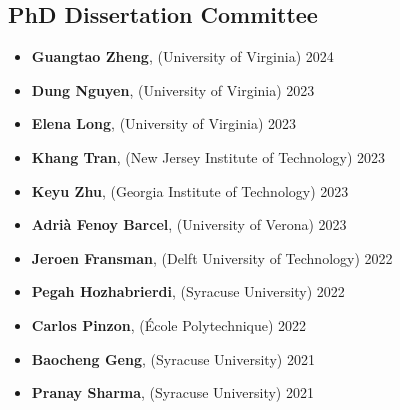 \subsection*{PhD Dissertation Committee}
\begin{itemize}
  \item \textbf{Guangtao Zheng}, ({\sc University of Virginia}) \hfill 2024
  \item \textbf{Dung Nguyen}, ({\sc University of Virginia}) \hfill 2023
  \item \textbf{Elena Long}, ({\sc University of Virginia}) \hfill 2023
  \item \textbf{Khang Tran}, ({\sc New Jersey Institute of Technology}) \hfill 2023
  \item \textbf{Keyu Zhu}, ({\sc Georgia Institute of Technology}) \hfill 2023
  \item \textbf{Adrià Fenoy Barcel}, ({\sc University of Verona}) \hfill 2023
  \item \textbf{Jeroen Fransman}, ({\sc Delft University of Technology}) \hfill 2022
  \item \textbf{Pegah Hozhabrierdi}, ({\sc Syracuse University}) \hfill 2022
  \item \textbf{Carlos Pinzon}, ({\sc École Polytechnique}) \hfill 2022
  \item \textbf{Baocheng Geng}, ({\sc Syracuse University}) \hfill 2021
  \item \textbf{Pranay Sharma}, ({\sc Syracuse University}) \hfill 2021
\end{itemize}
\medskip